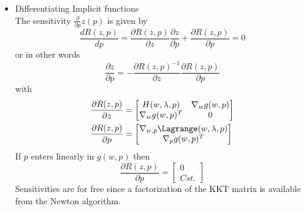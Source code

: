 \documentclass{article}
\newtheorem{theorem}{Theorem}[section]
\theoremstyle{example}
\theoremstyle{definition}
\theoremstyle{assumption}
\theoremstyle{lemma}
\begin{document}
\begin{itemize}
\begin{equation*}
\begin{bmatrix}
								\nabla_w^2\Lagrange(w,\lambda,p) & \nabla_wg(w,p)\\
						\nabla_wg(w,p)^T & 0
				\end{bmatrix}
				\begin{bmatrix}
					\Delta w\\
					\lambda
				\end{bmatrix}
				=-
				\begin{bmatrix}
					\nabla \Phi(w)\\
					g(w,p)
				\end{bmatrix}
			\end{equation*}
			\begin{theorem}
				The parametric solution $z(p)$ is well defined and $\mathcal{C}^1$ in a neighborhood of $p$ if the KKT matrix is full rank at $p$
			\end{theorem}
		\item Differentiating Implicit functions\\
		The sensitivity $\frac{\partial}{\partial p}z(p)$ is given by
		\begin{equation*}
			\frac{dR(z,p)}{dp}=\frac{\partial R(z,p)}{\partial z}\frac{\partial z}{\partial p}+\frac{\partial R(z,p)}{\partial p}=0
		\end{equation*}
		or in other words
		\begin{equation*}
			\frac{\partial z}{\partial p}=-\frac{\partial R(z,p)^{-1}}{\partial z}\frac{\partial R(z,p)}{\partial p}
		\end{equation*}
		with
		\begin{align*}
			\frac{\partial R(z,p)}{\partial z}&=
			\begin{bmatrix}
				H(w,\lambda,p) & \nabla_wg(w,p)\\
				\nabla_wg(w,p)^T& 0
			\end{bmatrix}\\
			\frac{\partial R(z,p)}{\partial p}&=
			\begin{bmatrix}
				\nabla_{w,p}\Lagrange(w,\lambda,p)\\
				\nabla_pg(w,p)^T
			\end{bmatrix}
		\end{align*}
		If $p$ enters linearly in $g(w,p)$ then 
			\begin{equation*}
				\frac{\partial R(z,p)}{\partial p}=\begin{bmatrix}0\\Cst.\end{bmatrix}
			\end{equation*}
			Sensitivities are for free since a factorization of the KKT matrix is available from the Newton algorithm.

\end{itemize}
\end{document}
